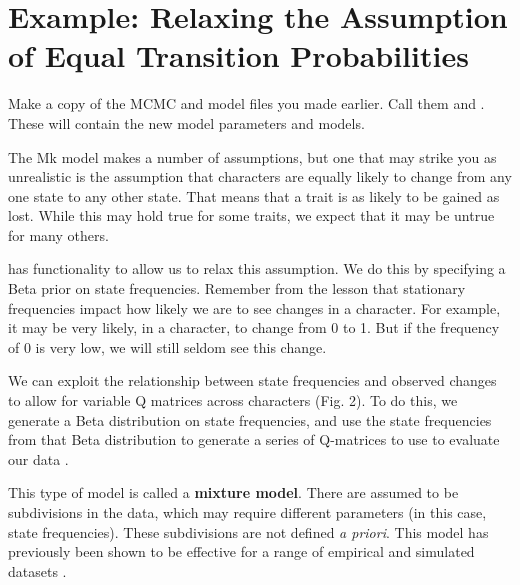 \section{Example: Relaxing the Assumption of Equal Transition Probabilities }\label{sec:dm_disc}


{\begin{framed}
Make a copy of the MCMC and model files you made earlier. 
Call them  and . 
These will contain the new model parameters and models. \par 
\end{framed}}
\begin{figure}[h!]
\label{fig:module-gm}
\end{figure}
The Mk model makes a number of assumptions, but one that may strike you as unrealistic is the assumption that characters are equally likely to change from any one state to any other state.
That means that a trait is as likely to be gained as lost.
While this may hold true for some traits, we expect that it may be untrue for many others. \par
\RevBayes has functionality to allow us to relax this assumption.
We do this by specifying a Beta prior on state frequencies.
Remember from the  lesson that stationary frequencies impact how likely we are to see changes in a character.
For example, it may be very likely, in a character, to change from 0 to 1.
But if the frequency of 0 is very low, we will still seldom see this change. \par
We can exploit the relationship between state frequencies and observed changes to allow for variable Q matrices across characters (Fig. 2).
To do this, we generate a Beta distribution on state frequencies, and use the state frequencies from that Beta distribution to generate a series of Q-matrices to use to evaluate our data \citep{Pagel2004}. \par
This type of model is called a \textbf{mixture model}.
There are assumed to be subdivisions in the data, which may require different parameters (in this case, state frequencies).
These subdivisions are not defined \textit{a priori}. 
This model has previously been shown to be effective for a range of empirical and simulated datasets \citep{Wright2016}.\par




